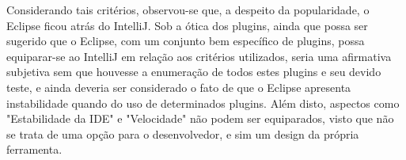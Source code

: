 \documentclass[12pt,journal,compsoc]{IEEEtran}
\begin{document}
Considerando tais critérios, observou-se que, a despeito da popularidade, o Eclipse ficou atrás do IntelliJ. Sob a ótica dos plugins, ainda que possa ser sugerido que o Eclipse, com um conjunto bem específico de plugins, possa equiparar-se ao IntelliJ em relação aos critérios utilizados, seria uma afirmativa subjetiva sem que houvesse a enumeração de todos estes plugins e seu devido teste, e ainda deveria ser considerado o fato de que o Eclipse apresenta instabilidade quando do uso de determinados plugins. Além disto, aspectos como "Estabilidade da IDE" e "Velocidade" não podem ser equiparados, visto que não se trata de uma opção para o desenvolvedor, e sim um design da própria ferramenta.




\end{document}
